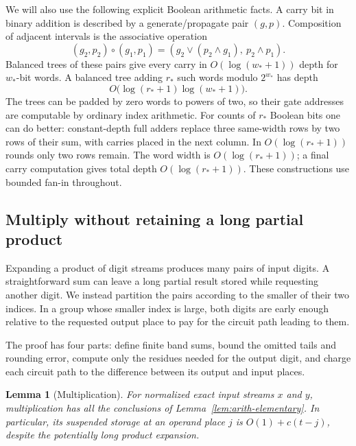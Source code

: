 \documentclass[11pt]{article}
\numberwithin{equation}{section}
\newtheorem{lemma}[theorem]{Lemma}
\theoremstyle{definition}
\theoremstyle{remark}
\begin{document}
We will also use the following explicit Boolean arithmetic facts.
A carry bit in binary addition is described by a generate/propagate
pair $(g,p)$.  Composition of adjacent intervals is the associative
operation
\[
 (g_2,p_2)\circ(g_1,p_1)
   =(g_2\lor(p_2\land g_1),\ p_2\land p_1).
\]
Balanced trees of these pairs give every carry in $O(\log({w_*}+1))$
depth for ${w_*}$-bit words.  A balanced tree adding ${r_*}$ such words modulo
$2^{w_*}$ has depth
\begin{equation}
 O\bigl(\log({r_*}+1)\log({w_*}+1)\bigr).
 \label{eq:arith-adder-depth}
\end{equation}
The trees can be padded by zero words to powers of two, so their
gate addresses are computable by ordinary index arithmetic.
For counts of ${r_*}$ Boolean bits one can do better: constant-depth
full adders replace three same-width rows by two rows of their sum,
with carries placed in the next column.  In $O(\log({r_*}+1))$ rounds
only two rows remain.  The word width is $O(\log({r_*}+1))$; a final
carry computation gives total depth $O(\log({r_*}+1))$.  These
constructions use bounded fan-in throughout.

\subsection{Multiply without retaining a long partial product}

Expanding a product of digit streams produces many pairs of input digits. A straightforward sum can leave a long partial result stored while requesting another digit. We instead partition the pairs according to the smaller of their two indices. In a group whose smaller index is large, both digits are early enough relative to the requested output place to pay for the circuit path leading to them.

The proof has four parts: define finite band sums, bound the omitted tails and rounding error, compute only the residues needed for the output digit, and charge each circuit path to the difference between its output and input places.

\begin{lemma}[Multiplication]
\label{lem:arith-multiplication}
For normalized exact input streams $x$ and $y$, multiplication has all
the conclusions of Lemma~\ref{lem:arith-elementary}.  In particular,
its suspended storage at an operand place $j$ is
$O(1)+c(t-j)$, despite the potentially long product expansion.
\end{lemma}
\end{document}
